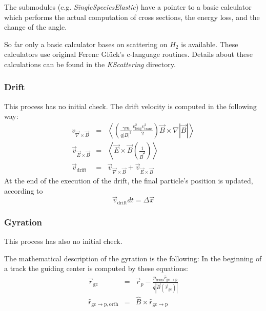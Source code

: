     The submodules (e.g. \textit{SingleSpeciesElastic}) have a pointer to a basic calculator which performs the actual computation of cross sections, the energy loss, and the change of the angle.
    
    So far only a basic calculator bases on scattering on $H_2$ is available. These calculators use original Ferenc Gl\"uck's c-language routines. Details about these calculations can be found in the \textit{KScattering} directory.
        
    \subsubsection*{Drift}
    This process has no initial check. The drift velocity is computed in the following way:
    \begin{eqnarray}
    {v}_{\vec{\nabla} \times \vec{B}} &=& \left \langle \left( \frac{ \gamma m }{ q  |B|  ^3} \frac{  v_{\mathrm{long}}^2  v_{\mathrm{trans}}^2 }{2} \right) \vec{B} \times \nabla  |\vec{B}| \right \rangle \\
    \vec{v}_{\vec{E} \times \vec{B}} &=& \left \langle \vec{E} \times  \vec{B} \left(\frac{1}{ \vec{B}^2}\right) \right \rangle \\
    \vec{v}_{\mathrm{drift}} &=& \vec{v}_{\vec{\nabla} \times \vec{B}}  + \vec{v}_{\vec{E} \times \vec{B}}
    \end{eqnarray}
    At the end of the execution of the drift, the final particle's position is updated, according to
    \begin{equation}
        \vec{v}_{\mathrm{drift}} dt = \Delta \vec{x}
    \end{equation} 
    
    
    \subsubsection*{Gyration}
    This process has also no initial check. 
    
    The mathematical description of the gyration is the following: In the beginning of a track the guiding center is computed by these equations:
    \begin{eqnarray}
        \vec{r}_{\mathrm{gc}} &=& \vec{r}_{p} - \frac{p_{\mathrm{trans}} \hat{r}_{\mathrm{gc\rightarrow p}}}{q |\vec{B}(\vec{r}_{\mathrm{gc}})| }\\
        \hat{r}_{\mathrm{gc\rightarrow p, orth}}  &=& \hat{B} \times \hat{r}_{\mathrm{gc\rightarrow p}} \\
    \end{eqnarray}
    

